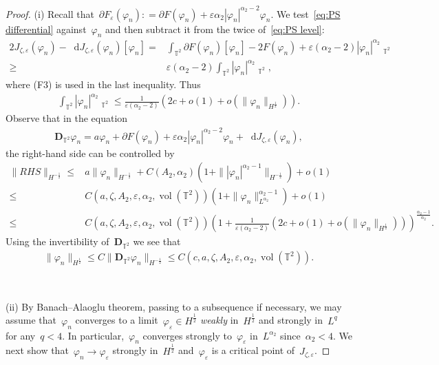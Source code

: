 \documentclass[10pt,a4paper]{amsart}
\newcommand{\T}{\mathbb{T}}
\newcommand{\dd}{\mathop{}\!\mathrm{d}}
\newcommand{\eps}{\varepsilon}
\newcommand{\pD}{\mathbf{D}}
\newcommand{\parenthesis}[1]{\left(#1\right)} %
\DeclareMathOperator{\dv}{\dd{vol}}
\DeclareMathOperator{\vol}{vol}
\begin{document}
\begin{proof}
    (i) Recall that~$\partial F_\eps(\varphi_n): = \partial F(\varphi_n) + \eps\alpha_2|\varphi_n|^{\alpha_2-2}\varphi_n$. 
    We test~\eqref{eq:PS differential} against~$\varphi_n$ and then subtract it from the twice of~\eqref{eq:PS level}:
    \begin{align}\label{eq: the energy functional minus the F-derivative}
    2J_{\zeta,\eps}(\varphi_n)-\dd J_{\zeta,\eps}(\varphi_n)[\varphi_n]
    =&\int_{\T^2}  \partial F(\varphi_n)[\varphi_n]-2F(\varphi_n)+\eps (\alpha_2-2)|\varphi_n|^{\alpha_2}\dv_{\T^2} \\
    \geq & \eps(\alpha_2-2)\int_{\T^2}  |\varphi_n|^{\alpha_2}\dv_{\T^2},
    \end{align}
    where (F3) is used in the last inequality. Thus
    \begin{align}
    \int_{\T^2}  |\varphi_n|^{\alpha_2}\dv_{\T^2} \leq
    \frac{1}{\eps(\alpha_2-2)} \parenthesis{ 2c + o(1) + o(\|\varphi_n\|_{H^{\frac12}})}.
    \end{align}
    Observe that in the equation
    \begin{align}
    \pD_{\T^2} \varphi_n = a\varphi_n + \partial F(\varphi_n) + \eps \alpha_2 |\varphi_n|^{\alpha_2-2}\varphi_n +\dd J_{\zeta,\eps}(\varphi_n),
    \end{align}
    the right-hand side can be controlled by
    \begin{align}
    \| RHS\|_{H^{-\frac{1}{2}}}
    \leq & a \|\varphi_n\|_{H^{-\frac{1}{2}}} +C(A_2,\alpha_2)( 1+\||\varphi_n|^{\alpha_2-1}\|_{H^{-\frac{1}{2}}}) + o(1) \\
    \leq & C(a,\zeta, A_2, \eps, \alpha_2, \vol(\T^2))(1+ \|\varphi_n\|_{L^{\alpha_2}}^{\alpha_2-1})   + o(1) \\
    \leq&  C(a,\zeta, A_2, \eps, \alpha_2, \vol(\T^2)) \parenthesis{1+\frac{1}{\eps(\alpha_2-2)} \parenthesis{ 2c + o(1) + o(\|\varphi_n\|_{H^{\frac12}})}}^{\frac{\alpha_2-1}{\alpha_2}}.
    \end{align}
    Using the invertibility of~$\pD_{\T^2}$ we see that 
    \begin{align}
    \|\varphi_n\|_{H^{\frac{1}{2}}} \leq C \|\pD_{\T^2}\varphi_n\|_{H^{-\frac{1}{2}}}\leq C(c,a,\zeta, A_2, \eps,\alpha_2,\vol(\T^2)).
    \end{align}

    \

    (ii) By Banach--Alaoglu theorem, passing to a subsequence if necessary, we may assume that~$\varphi_n$ converges  to a limit~$\varphi_\eps\in H^{\frac{1}{2}}$ \emph{weakly} in~$H^{\frac{1}{2}}$ and strongly in~$L^q$ for any~$q<4$.
    In particular,~$\varphi_n$ converges strongly to~$\varphi_\eps$ in~$L^{\alpha_2}$ since~$\alpha_2 <4$. 
    We next show that~$\varphi_n\to\varphi_\eps$ strongly in~$H^{\frac{1}{2}}$ and~$\varphi_\eps$ is a critical point of~$J_{\zeta,\eps}$.


\end{proof}
\end{document}

